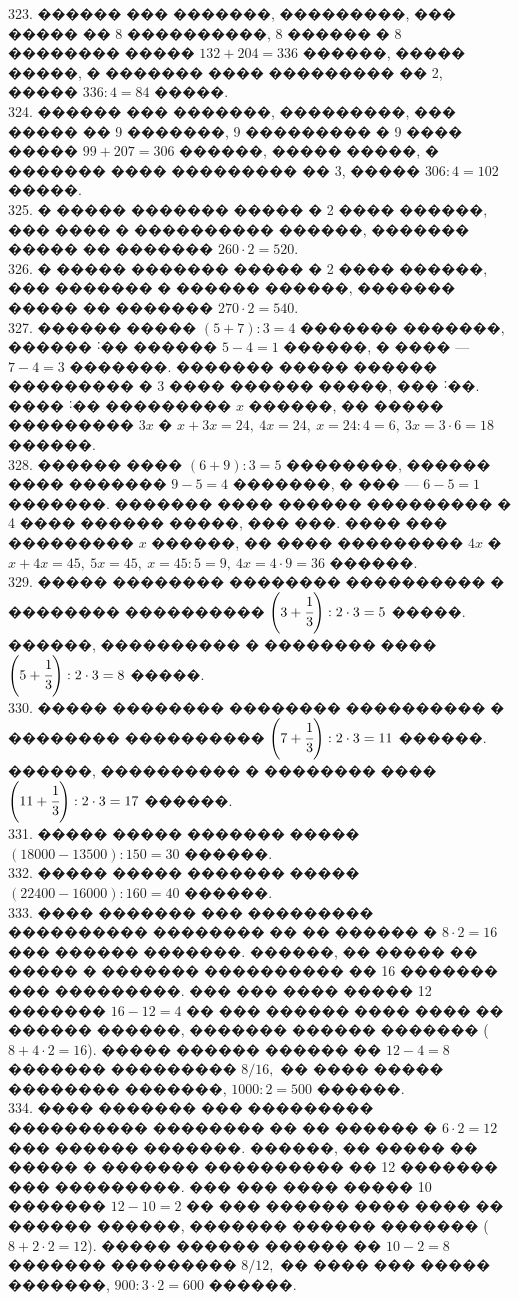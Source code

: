 \documentclass[12pt]{article}
\begin{document}
323. ������ ��� �������, ���������, ��� ����� �� 8 ����������, 8 ������ � 8 �������� ����� $132+204=336$ ������, ����� �����, � ������� ���� ��������� �� 2, ����� $336:4=84$ �����.\\
324. ������ ��� �������, ���������, ��� ����� �� 9 �������, 9 ��������� � 9 ���� ����� $99+207=306$ ������, ����� �����, � ������� ���� ��������� �� 3, ����� $306:4=102$ �����.\\
325. � ����� ������� ����� � 2 ���� ������, ��� ���� � ���������� ������, ������� ����� �� ������� $260\cdot2=520.$\\
326. � ����� ������� ����� � 2 ���� ������, ��� ������� � ������ ������, ������� ����� �� ������� $270\cdot2=540.$\\
327. ������ ����� $(5+7):3=4$ ������� �������, ������ ˸�� ������ $5-4=1$ ������, � ���� --- $7-4=3$ �������. ������� ����� ������ ��������� � 3 ���� ������ �����, ��� ˸��. ���� ˸�� ��������� $x$ ������, �� ����� ��������� $3x$ � $x+3x=24,\ 4x=24,\ x=24:4=6,\ 3x=3\cdot6=18$ ������.\\
328. ������ ���� $(6+9):3=5$ ��������, ������ ���� ������� $9-5=4$ �������, � ��� --- $6-5=1$ �������. ������� ���� ������ ��������� � 4 ���� ������ �����, ��� ���. ���� ��� ��������� $x$ ������, �� ���� ��������� $4x$ � $x+4x=45,\ 5x=45,\ x=45:5=9,\ 4x=4\cdot9=36$ ������.\\
329. ����� �������� �������� ���������� � �������� ���������� $\left(3+\cfrac{1}{3}\right):2\cdot3=5$ �����. ������, ���������� � �������� ���� $\left(5+\cfrac{1}{3}\right):2\cdot3=8$ �����.\\
330. ����� �������� �������� ���������� � �������� ���������� $\left(7+\cfrac{1}{3}\right):2\cdot3=11$ ������. ������, ���������� � �������� ���� $\left(11+\cfrac{1}{3}\right):2\cdot3=17$ ������.\\
331. ����� ����� ������� ����� $(18000-13500):150=30$ ������.\\
332. ����� ����� ������� ����� $(22400-16000):160=40$ ������.\\
333. ���� ������� ��� ��������� ���������� �������� �� �� ������ � $8\cdot2=16$ ��� ������ �������. ������, �� ����� �� ����� � ������� ���������� �� 16 ������� ��� ���������. ��� ��� ���� ����� 12 ������� $16-12=4$ �� ��� ������ ���� ���� �� ������ ������, ������� ������ ������� ($8+4\cdot2=16$). ����� ������ ������ �� $12-4=8$ ������� ��������� $8/16,$ �� ���� ����� �������� �������, $1000:2=500$ ������.\\
334. ���� ������� ��� ��������� ���������� �������� �� �� ������ � $6\cdot2=12$ ��� ������ �������. ������, �� ����� �� ����� � ������� ���������� �� 12 ������� ��� ���������. ��� ��� ���� ����� 10 ������� $12-10=2$ �� ��� ������ ���� ���� �� ������ ������, ������� ������ ������� ($8+2\cdot2=12$). ����� ������ ������ �� $10-2=8$ ������� ��������� $8/12,$ �� ���� ��� ����� �������, $900:3\cdot2=600$ ������.\\
\end{document}
